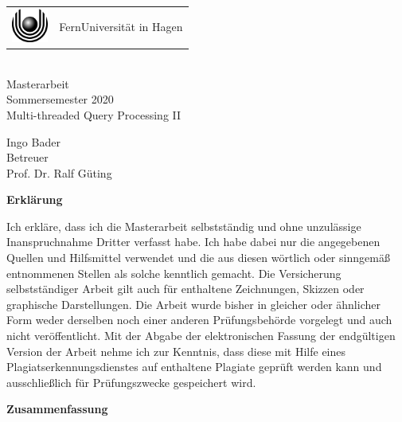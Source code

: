 \documentclass[a4paper,12pt,twoside]{article}
\newcommand{\Theme}{Multi-threaded Query Processing II}
\newcommand{\Name}{Ingo Bader}
\begin{document}
\thispagestyle{empty}
\pagestyle{empty}

\begin{center}
\begin{huge}
\vspace*{3cm}
    \begin{tabular}{m{1.2cm}@{\ \ }m{9cm}}
      \includegraphics[width=1.2cm]{logo.eps} & {FernUniversität in Hagen}
    \end{tabular}
    \\
    \vspace*{3cm}
   Masterarbeit \\
   Sommersemester 2020 \\[2em]
   \glqq{} \Theme \grqq{} \\[2cm]
\end{huge}
\begin{large}
	\Name \\[3cm]
   	Betreuer \\[1em]
   	Prof. Dr. Ralf Güting 
\end{large}
\end{center}

\clearpage
\textbf{Erklärung}

Ich erkläre, dass ich die Masterarbeit selbstständig und ohne unzulässige Inanspruchnahme Dritter verfasst habe. Ich habe dabei nur die angegebenen Quellen und Hilfsmittel verwendet und die aus diesen wörtlich oder sinngemäß entnommenen Stellen als solche kenntlich gemacht. Die Versicherung selbstständiger Arbeit gilt auch für enthaltene Zeichnungen, Skizzen oder graphische Darstellungen. Die Arbeit wurde bisher in gleicher oder ähnlicher Form weder derselben noch einer anderen Prüfungsbehörde vorgelegt und auch nicht veröffentlicht. Mit der Abgabe der elektronischen Fassung der endgültigen Version der Arbeit nehme ich zur Kenntnis, dass diese mit Hilfe eines Plagiatserkennungsdienstes auf enthaltene Plagiate geprüft werden kann und ausschließlich für Prüfungszwecke gespeichert wird.

\clearpage

\textbf{Zusammenfassung}
\end{document}

